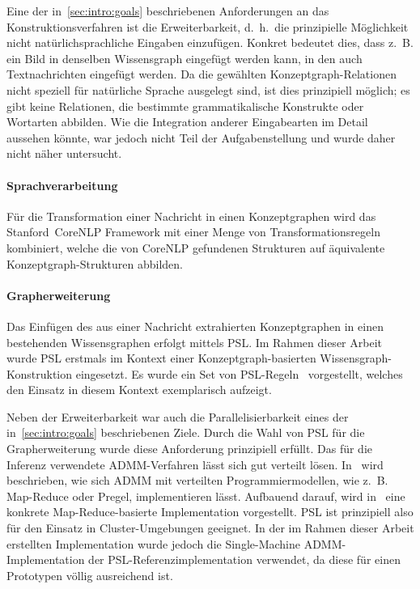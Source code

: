 Eine der in~\ref{sec:intro:goals} beschriebenen Anforderungen an das Konstruktionsverfahren ist die Erweiterbarkeit, d.~h.\ die prinzipielle Möglichkeit nicht natürlichsprachliche Eingaben einzufügen.
Konkret bedeutet dies, dass z.~B. ein Bild in denselben Wissensgraph eingefügt werden kann, in den auch Textnachrichten eingefügt werden.
Da die gewählten Konzeptgraph-Relationen nicht speziell für natürliche Sprache ausgelegt sind, ist dies prinzipiell möglich;
es gibt keine Relationen, die bestimmte grammatikalische Konstrukte oder Wortarten abbilden.
Wie die Integration anderer Eingabearten im Detail aussehen könnte, war jedoch nicht Teil der Aufgabenstellung und wurde daher nicht näher untersucht.

\paragraph{Sprachverarbeitung}
Für die Transformation einer Nachricht in einen Konzeptgraphen wird das Stanford~CoreNLP Framework mit einer Menge von Transformationsregeln~ kombiniert, welche die von CoreNLP gefundenen Strukturen auf äquivalente Konzeptgraph-Strukturen abbilden.

\paragraph{Grapherweiterung}
Das Einfügen des aus einer Nachricht extrahierten Konzeptgraphen in einen bestehenden Wissensgraphen erfolgt mittels PSL.\@
Im Rahmen dieser Arbeit wurde PSL erstmals im Kontext einer Konzeptgraph-basierten Wissensgraph-Konstruktion eingesetzt.
Es wurde ein Set von PSL-Regeln~ vorgestellt, welches den Einsatz in diesem Kontext exemplarisch aufzeigt.

Neben der Erweiterbarkeit war auch die Parallelisierbarkeit eines der in~\ref{sec:intro:goals} beschriebenen Ziele.
Durch die Wahl von PSL für die Grapherweiterung wurde diese Anforderung prinzipiell erfüllt.
Das für die Inferenz verwendete ADMM-Verfahren lässt sich gut verteilt lösen.
In~\cite[Kapitel 10]{Boyd2011} wird beschrieben, wie sich ADMM mit verteilten Programmiermodellen, wie z.~B. Map-Reduce oder Pregel, implementieren lässt.
Aufbauend darauf, wird in~\cite{Lubell-Doughtie2013} eine konkrete Map-Reduce-basierte Implementation vorgestellt.
PSL ist prinzipiell also für den Einsatz in Cluster-Umgebungen geeignet.
In der im Rahmen dieser Arbeit erstellten Implementation wurde jedoch die Single-Machine ADMM-Implementation der PSL-Referenzimplementation verwendet, da diese für einen Prototypen völlig ausreichend ist.

